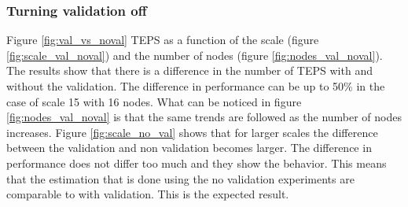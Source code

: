 \subsubsection{Turning validation off}
\label{sec:noval}
 Figure \ref{fig:val_vs_noval} TEPS as a function of the scale (figure \ref{fig:scale_val_noval}) and the number of nodes (figure \ref{fig:nodes_val_noval}). The results show that there is a difference in the number of TEPS with and without the validation. The difference in performance can be up to 50\% in the case of scale 15 with 16 nodes. What can be noticed in figure \ref{fig:nodes_val_noval} is that the same trends are followed as the number of nodes increases.
 Figure \ref{fig:scale_no_val} shows that for larger scales the difference between the validation and non validation becomes larger.
The difference in performance does not differ too much and they show the behavior. This means that the estimation that is done using the no validation experiments are comparable to with validation. This is the expected result. 

